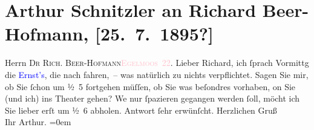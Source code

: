 

               \section[Arthur Schnitzler an Richard Beer-Hofmann, {[}25. 7. 1895?{]}]{ Arthur Schnitzler an Richard Beer-Hofmann, {[}25. 7. 1895?{]}}\nopagebreak{}\rehead{ }\normalsize\beginnumbering{} \toendnotes[C]{\smallbreak\pagebreak[2]} 
\toendnotes[C]{\smallbreak}\pstart{}{\pb}Herrn \textsc{Dr Rich.
                     Beer-Hofmann}\pend{}\pstart{}\textsc{\textcolor{pink}{Egelmoos 22}{}\ledrightnote{\textcolor{pink}{Eglmoosgasse}}.}\pend{}{\bigskip}\pstart
           \noindent{}{\pb}Lieber Richard, ich ſprach
               Vormittg die \textcolor{blue}{Ernst’s}{}\ledrightnote{\textcolor{blue}{Carla Ernst}{\newline}\textcolor{blue}{Katharina Kohn}}, die nach \label{K_L00466_1v}\label{K_L00466_1h} fahren, – was natürlich zu nichts
               verpflichtet. Sagen Sie mir, ob Sie ſchon um ½ 5 fortgehen müſſen, ob Sie was
               beſondres vorhaben, on Sie (und ich) ins Theater gehen? We{\geminationn} nur ſpazieren gegangen {\pb}werden ſoll, möcht ich Sie lieber erſt um ½ 6
               abholen.\pend
           \pstart
           Antwort ſehr erwünſcht.\pend
           \pstart
           Herzlichen Gruß{\\[\baselineskip]}Ihr \spacefill\mbox{Arthur.}\pend
           \leftskip=0em{}\endnumbering{}  
      